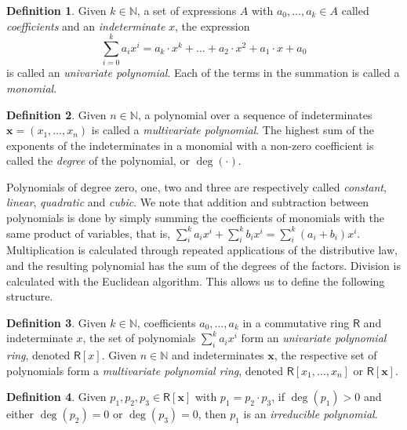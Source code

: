 \documentclass[draft, 12pt, a4paper, oneside]{memoir}
\theoremstyle{definition}
\newtheorem{definition}{Definition}[section]
\theoremstyle{remark}
\begin{document}
\begin{definition}
  Given $k \in \mathbb{N}$, a set of expressions $A$ with $a_{0}, \dots, a_{k} \in A$ called \emph{coefficients} and an \emph{indeterminate} $x$, the expression $$\sum_{i = 0}^{k} a_{i} x^{i} = a_{k} \cdot x^{k} + \dots + a_{2} \cdot x^{2} + a_{1} \cdot x + a_{0}$$ is called an \emph{univariate polynomial}. Each of the terms in the summation is called a \emph{monomial}.
\end{definition}

\begin{definition}
  Given $n \in \mathbb{N}$, a polynomial over a sequence of indeterminates $\mathbf{x} = (x_{1}, \dots, x_{n})$ is called a \emph{multivariate polynomial}. The highest sum of the exponents of the indeterminates in a monomial with a non-zero coefficient is called the \emph{degree} of the polynomial, or $\deg(\cdot)$.
\end{definition}

Polynomials of degree zero, one, two and three are respectively called \emph{constant}, \emph{linear}, \emph{quadratic} and \emph{cubic}. We note that addition and subtraction between polynomials is done by simply summing the coefficients of monomials with the same product of variables, that is, $\sum_{i}^{k} a_{i} x^{i} + \sum_{i}^{k} b_{i} x^{i} = \sum_{i}^{k} (a_{i} + b_{i}) x^{i}$. Multiplication is calculated through repeated applications of the distributive law, and the resulting polynomial has the sum of the degrees of the factors. Division is calculated with the Euclidean algorithm. This allows us to define the following structure.

\begin{definition}
  Given $k \in \mathbb{N}$, coefficients $a_{0}, \dots, a_{k}$ in a commutative ring $\textsf{R}$ and indeterminate $x$, the set of polynomials $\sum_{i}^{k} a_{i} x^{i}$ form an \emph{univariate polynomial ring}, denoted $\textsf{R}[x]$. Given $n \in \mathbb{N}$ and indeterminates $\mathbf{x}$, the respective set of polynomials form a \emph{multivariate polynomial ring}, denoted $\textsf{R}[x_{1}, \dots, x_{n}]$ or $\textsf{R}[\textbf{x}]$.
\end{definition}

\begin{definition}
  Given $p_{1}, p_{2}, p_{3} \in \textsf{R}[\textbf{x}]$ with $p_{1} = p_{2} \cdot p_{3}$, if $\deg(p_{1}) > 0$ and either $\deg(p_{2}) = 0$ or $\deg(p_{3}) = 0$, then $p_{1}$ is an \emph{irreducible polynomial}.
\end{definition}
\end{document}
